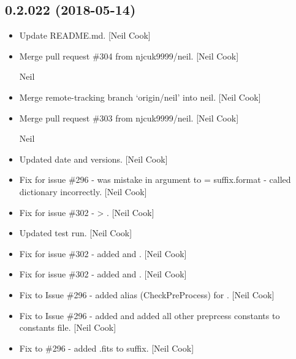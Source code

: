 \documentclass[a4paper,10pt,english]{report}
\begin{document}
\subsection{0.2.022 (2018-05-14)}
\label{\detokenize{misc/changelog:id439}}\begin{itemize}
\item {} 
Update README.md. {[}Neil Cook{]}

\item {} 
Merge pull request \#304 from njcuk9999/neil. {[}Neil Cook{]}

Neil

\item {} 
Merge remote-tracking branch ‘origin/neil’ into neil. {[}Neil Cook{]}

\item {} 
Merge pull request \#303 from njcuk9999/neil. {[}Neil Cook{]}

Neil

\item {} 
Updated date and versions. {[}Neil Cook{]}

\item {} 
Fix for issue \#296 - was mistake in argument to  =
suffix.format  - called dictionary incorrectly. {[}Neil Cook{]}

\item {} 
Fix for issue \#302 -  \textendash{}\textgreater{} . {[}Neil Cook{]}

\item {} 
Updated test run. {[}Neil Cook{]}

\item {} 
Fix for issue \#302 - added  and . {[}Neil
Cook{]}

\item {} 
Fix for issue \#302 - added  and . {[}Neil
Cook{]}

\item {} 
Fix to Issue \#296 - added alias (CheckPreProcess) for
. {[}Neil Cook{]}

\item {} 
Fix to Issue \#296 - added  and added all other
preprcess constants to constants file. {[}Neil Cook{]}

\item {} 
Fix to \#296 - added .fits to suffix. {[}Neil Cook{]}


\end{itemize}
\end{document}
